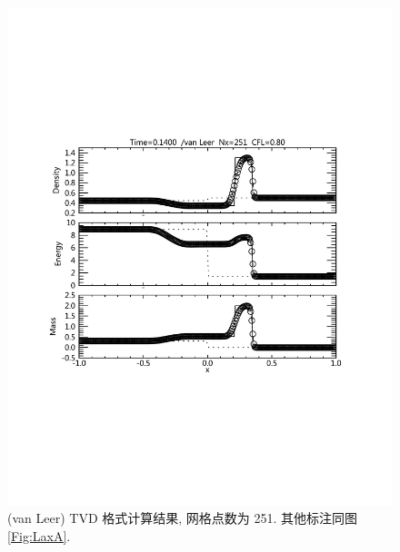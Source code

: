 \documentclass[10.5pt
]{article}
\begin{document}
\begin{figure}
\begin{center}
\includegraphics[width=.85\textwidth]{fig_tvd_1.pdf}
\caption{(van Leer) TVD 格式计算结果, 网格点数为 251. 其他标注同图\ref{Fig:LaxA}.}\label{Fig:vanLeerA}
\end{center}
\end{figure}
\end{document}
